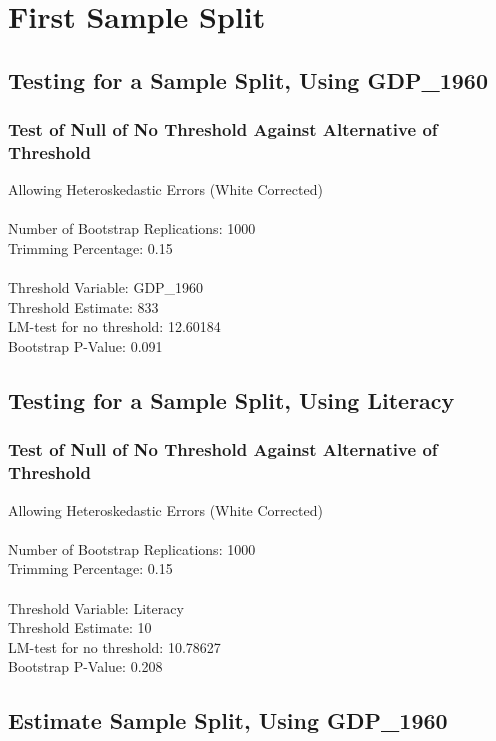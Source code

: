 \section{First Sample Split} 

\subsection{Testing for a Sample Split, Using GDP\_1960} 
\subsubsection*{Test of Null of No Threshold Against Alternative of Threshold} 
Allowing Heteroskedastic Errors (White Corrected) \\\\
Number of Bootstrap Replications:  1000 \\
Trimming Percentage:               0.15 \\\\
Threshold Variable:                 GDP\_1960 \\
Threshold Estimate:                833 \\
LM-test for no threshold:          12.60184 \\
Bootstrap P-Value:                 0.091 \\

\subsection{Testing for a Sample Split, Using Literacy} 
\subsubsection*{Test of Null of No Threshold Against Alternative of Threshold} 
Allowing Heteroskedastic Errors (White Corrected) \\\\
Number of Bootstrap Replications:  1000 \\
Trimming Percentage:               0.15 \\\\
Threshold Variable:                 Literacy \\
Threshold Estimate:                10 \\
LM-test for no threshold:          10.78627 \\
Bootstrap P-Value:                 0.208 \\

\subsection{Estimate Sample Split, Using GDP\_1960} 

